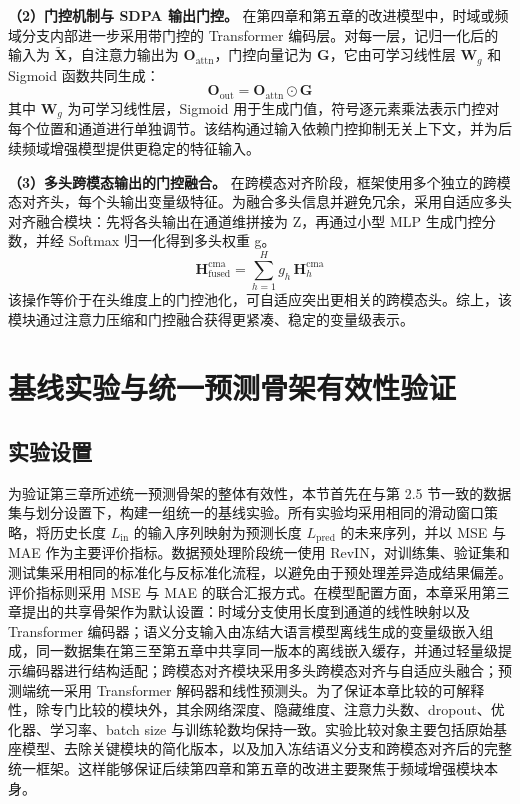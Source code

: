 \textbf{（2）门控机制与 SDPA 输出门控。} 在第四章和第五章的改进模型中，时域或频域分支内部进一步采用带门控的 Transformer 编码层。对每一层，记归一化后的输入为 $\tilde{\mathbf{X}}$，自注意力输出为 $\mathbf{O}_{\text{attn}}$，门控向量记为 $\mathbf{G}$，它由可学习线性层 $\mathbf{W}_g$ 和 Sigmoid 函数共同生成：
\begin{equation}
\mathbf{O}_{\text{out}} = \mathbf{O}_{\text{attn}} \odot \mathbf{G}
\label{eq:chap3-gated-attention}
\end{equation}
其中 $\mathbf{W}_g$ 为可学习线性层，Sigmoid 用于生成门值，符号逐元素乘法表示门控对每个位置和通道进行单独调节。该结构通过输入依赖门控抑制无关上下文，并为后续频域增强模型提供更稳定的特征输入。

\textbf{（3）多头跨模态输出的门控融合。} 在跨模态对齐阶段，框架使用多个独立的跨模态对齐头，每个头输出变量级特征。为融合多头信息并避免冗余，采用自适应多头对齐融合模块：先将各头输出在通道维拼接为 Z，再通过小型 MLP 生成门控分数，并经 Softmax 归一化得到多头权重 g。
\begin{equation}
\mathbf{H}^{\text{cma}}_{\text{fused}} = \sum_{h=1}^{H} g_h\,\mathbf{H}^{\text{cma}}_h
\label{eq:chap3-head-fusion}
\end{equation}
该操作等价于在头维度上的门控池化，可自适应突出更相关的跨模态头。综上，该模块通过注意力压缩和门控融合获得更紧凑、稳定的变量级表示。

\section{基线实验与统一预测骨架有效性验证}
\subsection{实验设置}
为验证第三章所述统一预测骨架的整体有效性，本节首先在与第 2.5 节一致的数据集与划分设置下，构建一组统一的基线实验。所有实验均采用相同的滑动窗口策略，将历史长度 $L_{\text{in}}$ 的输入序列映射为预测长度 $L_{\text{pred}}$ 的未来序列，并以 MSE 与 MAE 作为主要评价指标。数据预处理阶段统一使用 RevIN，对训练集、验证集和测试集采用相同的标准化与反标准化流程，以避免由于预处理差异造成结果偏差。评价指标则采用 MSE 与 MAE 的联合汇报方式。在模型配置方面，本章采用第三章提出的共享骨架作为默认设置：时域分支使用长度到通道的线性映射以及 Transformer 编码器；语义分支输入由冻结大语言模型离线生成的变量级嵌入组成，同一数据集在第三至第五章中共享同一版本的离线嵌入缓存，并通过轻量级提示编码器进行结构适配；跨模态对齐模块采用多头跨模态对齐与自适应头融合；预测端统一采用 Transformer 解码器和线性预测头。为了保证本章比较的可解释性，除专门比较的模块外，其余网络深度、隐藏维度、注意力头数、dropout、优化器、学习率、batch size 与训练轮数均保持一致。实验比较对象主要包括原始基座模型、去除关键模块的简化版本，以及加入冻结语义分支和跨模态对齐后的完整统一框架。这样能够保证后续第四章和第五章的改进主要聚焦于频域增强模块本身。

